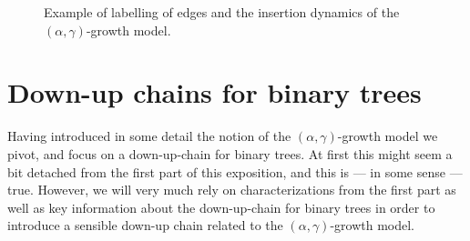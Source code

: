   \begin{figure}[t]\label{fig:alphagammachain}
    \centering
    
    \caption{Example of labelling of edges and the insertion dynamics of the $(\alpha, \gamma)$-growth model.}
  \end{figure}

\section{Down-up chains for binary trees}
%
Having introduced in some detail the notion of the $(\alpha, \gamma)$-growth model we pivot, and focus on a down-up-chain for binary trees.
At first this might seem a bit detached from the first part of this exposition, and this is --- in some sense --- true.
However, we will very much rely on characterizations from the first part as well as key information about the down-up-chain for binary trees in order to introduce a sensible down-up chain related to the $(\alpha, \gamma)$-growth model.

